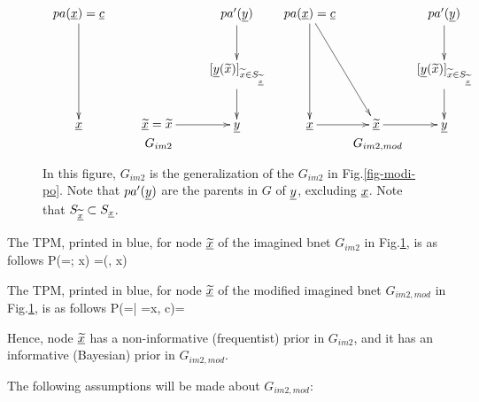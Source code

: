 \begin{figure}[h!]
$$
\begin{array}{cc}
\xymatrix{
pa(\rvx) =\rvc
\ar[dd]
&
&pa'(\rvy)\ar[d]
\\
&&[\rvy(\tilx)]_{\tilx\in S_{\ul{\tilx}}}\ar[d]
\\
\rvx
&\ul{\tilx}=\tilx\ar[r]
&\rvy
}
&
\xymatrix{
pa(\rvx)=\rvc
\ar[dd]\ar[ddr]
&
&pa'(\rvy)\ar[d]
\\
&&[\rvy(\tilx)]_{\tilx\in S_{\ul{\tilx}}}\ar[d]
\\
\rvx\ar[r]
&\ul{\tilx}\ar[r]
&\rvy
}
\\
G_{im2}
 &G_{im2,mod}
\end{array}
$$
\caption{In this figure, $G_{im2}$
is the generalization of the $G_{im2}$
in Fig.\ref{fig-modi-po}.
Note that $pa'({\underline{y}})$ are the parents in $G$ of
${\underline{y}}$, excluding ${\underline{x}}$.
Note that $S_{\underline{{\widetilde{x}}}}\subset S_{\underline{x}}$. }
\label{fig-unmodi-modi}
\end{figure}

The TPM, printed in  blue, for node $\underline{{\widetilde{x}}}$
of the imagined bnet $G_{im2}$ in Fig.\ref{fig-unmodi-modi}, is as follows
\beq\color{blue}
P(\ul{\tilx}=\tilx; x) =\delta(\tilx, x)
\eeq

The TPM, printed in  blue, for node $\underline{{\widetilde{x}}}$
of the modified imagined bnet $G_{im2,mod}$ in Fig.\ref{fig-unmodi-modi},
 is as follows
\beq\color{blue}
P(\ul{\tilx}=\tilx | \rvx=x, c)= 
\eeq

Hence, node $\underline{{\widetilde{x}}}$
has a non-informative (frequentist) prior in $G_{im2}$,
and it has an informative (Bayesian) prior in $G_{im2,mod}$.

The following
assumptions will
be made about $G_{im2, mod}$:

